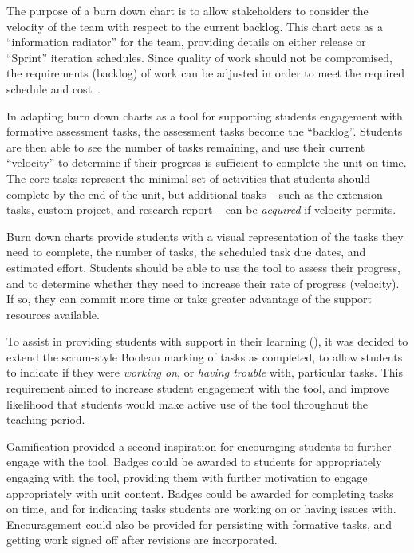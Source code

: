 The purpose of a burn down chart is to allow stakeholders to consider the velocity of the team with respect to the current backlog. This chart acts as a ``information radiator'' \cite{Cockburn:2002} for the team, providing details on either release or ``Sprint'' iteration schedules. Since quality of work should not be compromised, the requirements (backlog) of work can be adjusted in order to meet the required schedule and cost~\cite{Sutherland:2007}.

In adapting burn down charts as a tool for supporting students engagement with formative assessment tasks, the assessment tasks become the ``backlog''. Students are then able to see the number of tasks remaining, and use their current ``velocity'' to determine if their progress is sufficient to complete the unit on time. The core tasks represent the minimal set of activities that students should complete by the end of the unit, but additional tasks -- such as the extension tasks, custom project, and research report -- can be \emph{acquired} if velocity permits.

Burn down charts provide students with a visual representation of the tasks they need to complete, the number of tasks, the scheduled task due dates, and estimated effort. Students should be able to use the tool to assess their progress, and to determine whether they need to increase their rate of progress (velocity). If so, they can commit more time or take greater advantage of the support resources available. 

To assist in providing students with support in their learning (), it was decided to extend the scrum-style Boolean marking of tasks as completed, to allow students to indicate if they were \emph{working on}, or \emph{having trouble} with, particular tasks. This requirement aimed to increase student engagement with the tool, and improve likelihood that students would make active use of the tool throughout the teaching period.

Gamification \cite{Deterding:2011} provided a second inspiration for encouraging students to further engage with the tool. Badges could be awarded to students for appropriately engaging with the tool, providing them with further motivation to engage appropriately with unit content. Badges could be awarded for completing tasks on time, and for indicating tasks students are working on or having issues with. Encouragement could also be provided for persisting with formative tasks, and getting work signed off after revisions are incorporated.

